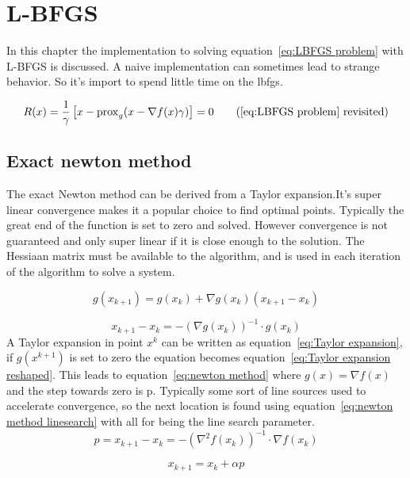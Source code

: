 \chapter{L-BFGS}
	In this chapter the implementation to solving equation~\ref{eq:LBFGS problem} with L-BFGS is discussed. A naive implementation can sometimes lead to strange behavior. So it's import to spend little time on the lbfgs.
	
	\begin{equation}
		R(x) = \frac{1}{\gamma}\left[ x - \prox_g( x - \nabla f(x)\gamma) \right] = 0
		\tag{\ref{eq:LBFGS problem} revisited}
	\end{equation}
	
	\section{Exact newton method}
	The exact Newton method can be derived from a Taylor expansion.It's super linear convergence makes it a popular choice to find optimal points. Typically the great end of the function is set to zero and solved. However convergence is not guaranteed and only super linear if it is close enough to the solution. The Hessiaan matrix must be available to the algorithm, and is used in each iteration of the algorithm to solve a system.
	
		\begin{equation}
			g(x_{k+1}) = g(x_k) + \nabla g(x_k)(x_{k+1}-x_k)
			\label{eq:Taylor expansion}
		\end{equation}
		
		\begin{equation}
			x_{k+1}-x_k = -(\nabla g(x_k))^{-1} \cdot g(x_k)
			\label{eq:Taylor expansion reshaped}
		\end{equation}
	A Taylor expansion in point $x^k$ can be written as equation~\ref{eq:Taylor expansion}, if $g(x^{k+1})$ is set to zero the equation becomes equation~\ref{eq:Taylor expansion reshaped}. This leads to equation~\ref{eq:newton method} where $g(x)=\nabla f(x)$ and the step towards zero is p. Typically some sort of line sources used to accelerate convergence, so the next location is found using equation~\ref{eq:newton method linesearch} with all for being the line search parameter.	
		\begin{equation}
			p = x_{k+1}-x_k = -(\nabla^2 f(x_k))^{-1} \cdot \nabla f(x_k)
			\label{eq:newton method}	
		\end{equation}
	
		\begin{equation}
		 	x_{k+1} = x_k + \alpha p
		 	\label{eq:newton method linesearch}
		\end{equation}
		
